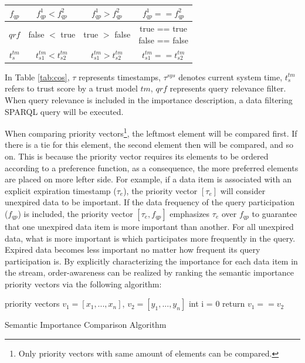 \begin{table}[!htbp]
\begin{tabular}{|c|c|c|c|}
        $f_{qp}$ & $f^{1}_{qp} < f^{2}_{qp}$ & $f^{1}_{qp} > f^{2}_{qp}$ & $f^{1}_{qp} == f^{2}_{qp}$ \\ \hline
        $qrf$ & false $<$ true & true $>$ false & \makecell{true == true \\false == false} \\ \hline
        $t^{tm}_{s}$ & $t^{tm}_{s1} < t^{tm}_{s2}$ & $t^{tm}_{s1} > t^{tm}_{s2}$ & $t^{tm}_{s1} == t^{tm}_{s2}$ \\ \hline        
	\end{tabular}
\end{table}

In Table \ref{tab:cos}, $\tau$ represents timestamps, $\tau^{sys}$ denotes current system time, $t^{tm}_{s}$ refers to trust score by a trust model $tm$, $qrf$ represents query relevance filter. 
When query relevance is included in the importance description, a data filtering SPARQL query will be executed. 

When comparing priority vectors\footnote{Only priority vectors with same amount of elements can be compared.}, the leftmost element will be compared first. 
If there is a tie for this element, the second element then will be compared, and so on. 
This is because the priority vector requires its elements to be ordered according to a preference function, as a consequence, the more preferred elements are placed on more lefter side. 
For example, if a data item is associated with an explicit expiration timestamp ($\tau_{e}$), the priority vector $[\tau_{e}]$ will consider unexpired data to be important.
If the data frequency of the query participation ($f_{qp}$) is included, the priority vector $[\tau_{e}, f_{qp}]$ emphasizes $\tau_{e}$ over $f_{qp}$ to guarantee that one unexpired data item is more important than another.
For all unexpired data, what is more important is which participates more frequently in the query.
Expired data becomes less important no matter how frequent its query participation is.
By explicitly characterizing the importance for each data item in the stream, order-awareness can be realized by ranking the semantic importance priority vectors via the following algorithm:

\begin{algorithm}[!htbp]
  priority vectors $v_{1} = [x_{1}, ... , x_{n}]$, $v_{2} = [y_{1}, ... , y_{n}]$ \;
  int i = 0 \;
   {
  }
   { 
  	return $v_{1} == v_{2}$ \;  
  }
\caption{Semantic Importance Comparison Algorithm}
\end{algorithm}
%
